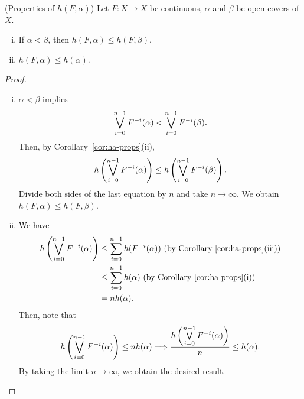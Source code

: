 \documentclass[10pt,twoside,draft]{book}
\begin{document}
\begin{proposition}
  (Properties of $h(F, \alpha)$)
  Let $F: X \to X$ be continuous, $\alpha$ and $\beta$ be open covers of $X$.
  \begin{enumerate}[(i)]
    \item If $\alpha < \beta$, then $h(F, \alpha) \leq h(F, \beta)$.
    \item $h(F, \alpha) \leq h(\alpha)$.
  \end{enumerate}
  \label{prop:hfa-props}
  \begin{proof}
   \begin{enumerate}[(i)]
    \item 
      $\alpha < \beta$ implies
      \begin{equation*}
        \bigvee\limits_{i=0}^{n-1} F^{-i}(\alpha)
        <
        \bigvee\limits_{i=0}^{n-1} F^{-i}(\beta).
      \end{equation*}
      Then, by Corollary~\ref{cor:ha-props}(ii),
      \begin{equation*}
        h\left (  \bigvee\limits_{i=0}^{n-1} F^{-i}(\alpha)  \right )
        \leq
        h\left (  \bigvee\limits_{i=0}^{n-1} F^{-i}(\beta)  \right ).
      \end{equation*}
      Divide both sides of the last equation by $n$ and take $n \to \infty$.
      We obtain $h(F, \alpha) \leq h(F, \beta)$.
    \item 
      We have
      \begin{align*}
        h\left (  \bigvee\limits_{i=0}^{n-1} F^{-i}(\alpha)  \right )
        &\leq \sum\limits_{i=0}^{n-1} h(F^{-i}(\alpha)) 
        \mbox{ (by Corollary~\ref{cor:ha-props}(iii))} \\
        &\leq \sum\limits_{i=0}^{n-1} h(\alpha) 
        \mbox{ (by Corollary~\ref{cor:ha-props}(i))}  \\
        &= n h(\alpha).
      \end{align*}
      Then, note that
      \begin{equation*}
        h\left (  \bigvee\limits_{i=0}^{n-1} F^{-i}(\alpha)  \right )
        \leq n h(\alpha)
        \Longrightarrow 
        \frac{ h\left (  \bigvee\limits_{i=0}^{n-1} F^{-i}(\alpha)  \right ) }{n}
        \leq h(\alpha).
      \end{equation*}
      By taking the limit $n \to \infty$, we obtain the desired result.
  \end{enumerate}
  \end{proof}
\end{proposition}
\end{document}
